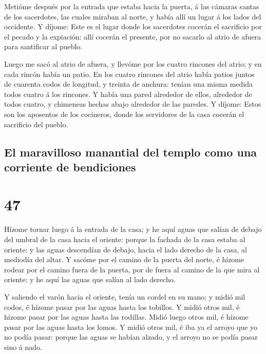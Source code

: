  Metióme después por la entrada que estaba hacia la
puerta, á las cámaras santas de los sacerdotes, las cuales miraban al
norte, y había allí un lugar á los lados del occidente. 
Y díjome: Este es el lugar donde los sacerdotes cocerán el sacrificio
por el pecado y la expiación: allí cocerán el presente, por no sacarlo
al atrio de afuera para santificar al pueblo.

 Luego me sacó al atrio de afuera, y llevóme por los
cuatro rincones del atrio; y en cada rincón había un patio.
 En los cuatro rincones del atrio había patios juntos de
cuarenta codos de longitud, y treinta de anchura: tenían una misma
medida todos cuatro á los rincones.  Y había una pared
alrededor de ellos, alrededor de todos cuatro, y chimeneas hechas abajo
alrededor de las paredes.  Y díjome: Estos son los
aposentos de los cocineros, donde los servidores de la casa cocerán el
sacrificio del pueblo.

\hypertarget{el-maravilloso-manantial-del-templo-como-una-corriente-de-bendiciones}{%
\subsection{El maravilloso manantial del templo como una corriente de
bendiciones}\label{el-maravilloso-manantial-del-templo-como-una-corriente-de-bendiciones}}

\hypertarget{section-46}{%
\section{47}\label{section-46}}

 Hízome tornar luego á la entrada de la casa; y he aquí
aguas que salían de debajo del umbral de la casa hacia el oriente:
porque la fachada de la casa estaba al oriente: y las aguas descendían
de debajo, hacia el lado derecho de la casa, al mediodía del altar.
 Y sacóme por el camino de la puerta del norte, é hízome
rodear por el camino fuera de la puerta, por de fuera al camino de la
que mira al oriente: y he aquí las aguas que salían al lado derecho.

 Y saliendo el varón hacia el oriente, tenía un cordel en
su mano; y midió mil codos, é hízome pasar por las aguas hasta los
tobillos.  Y midió otros mil, é hízome pasar por las aguas
hasta las rodillas. Midió luego otros mil, é hízome pasar por las aguas
hasta los lomos.  Y midió otros mil, é iba ya el arroyo
que yo no podía pasar: porque las aguas se habían alzado, y el arroyo no
se podía pasar sino á nado.

